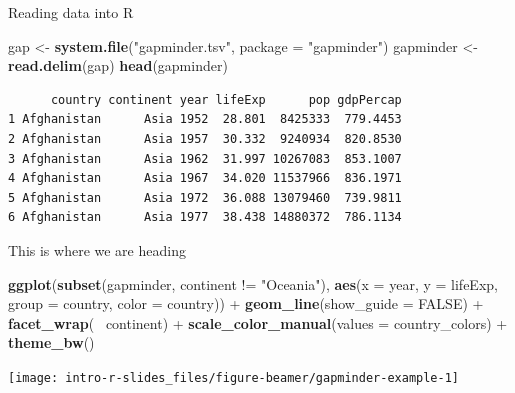 \documentclass[10pt,ignorenonframetext,compress, aspectratio=169]{beamer}
\newenvironment{Shaded}{\begin{snugshade}}{\end{snugshade}}
\newcommand{\KeywordTok}[1]{\textcolor[rgb]{0.13,0.29,0.53}{\textbf{{#1}}}}
\newcommand{\DataTypeTok}[1]{\textcolor[rgb]{0.13,0.29,0.53}{{#1}}}
\newcommand{\StringTok}[1]{\textcolor[rgb]{0.31,0.60,0.02}{{#1}}}
\newcommand{\OtherTok}[1]{\textcolor[rgb]{0.56,0.35,0.01}{{#1}}}
\newcommand{\NormalTok}[1]{{#1}}
\begin{document}
\begin{frame}[fragile]{Reading data into R}

\scriptsize

\begin{Shaded}
\begin{Highlighting}[]
\NormalTok{gap <-}\StringTok{ }\KeywordTok{system.file}\NormalTok{(}\StringTok{"gapminder.tsv"}\NormalTok{, }\DataTypeTok{package =} \StringTok{"gapminder"}\NormalTok{)}
\NormalTok{gapminder <-}\StringTok{ }\KeywordTok{read.delim}\NormalTok{(gap)}
\KeywordTok{head}\NormalTok{(gapminder)}
\end{Highlighting}
\end{Shaded}

\begin{verbatim}
      country continent year lifeExp      pop gdpPercap
1 Afghanistan      Asia 1952  28.801  8425333  779.4453
2 Afghanistan      Asia 1957  30.332  9240934  820.8530
3 Afghanistan      Asia 1962  31.997 10267083  853.1007
4 Afghanistan      Asia 1967  34.020 11537966  836.1971
5 Afghanistan      Asia 1972  36.088 13079460  739.9811
6 Afghanistan      Asia 1977  38.438 14880372  786.1134
\end{verbatim}

\normalsize

\end{frame}

\begin{frame}[fragile]{This is where we are heading}

\scriptsize

\begin{Shaded}
\begin{Highlighting}[]
\KeywordTok{ggplot}\NormalTok{(}\KeywordTok{subset}\NormalTok{(gapminder, continent !=}\StringTok{ "Oceania"}\NormalTok{),}
       \KeywordTok{aes}\NormalTok{(}\DataTypeTok{x =} \NormalTok{year, }\DataTypeTok{y =} \NormalTok{lifeExp, }\DataTypeTok{group =} \NormalTok{country, }\DataTypeTok{color =} \NormalTok{country)) +}
\StringTok{  }\KeywordTok{geom_line}\NormalTok{(}\DataTypeTok{show_guide =} \OtherTok{FALSE}\NormalTok{) +}\StringTok{ }\KeywordTok{facet_wrap}\NormalTok{(~}\StringTok{ }\NormalTok{continent) +}
\StringTok{  }\KeywordTok{scale_color_manual}\NormalTok{(}\DataTypeTok{values =} \NormalTok{country_colors) +}
\StringTok{  }\KeywordTok{theme_bw}\NormalTok{()}
\end{Highlighting}
\end{Shaded}

\begin{center}\texttt{[image: intro-r-slides\_files/figure-beamer/gapminder-example-1]} \end{center}

\normalsize

\end{frame}
\end{document}
